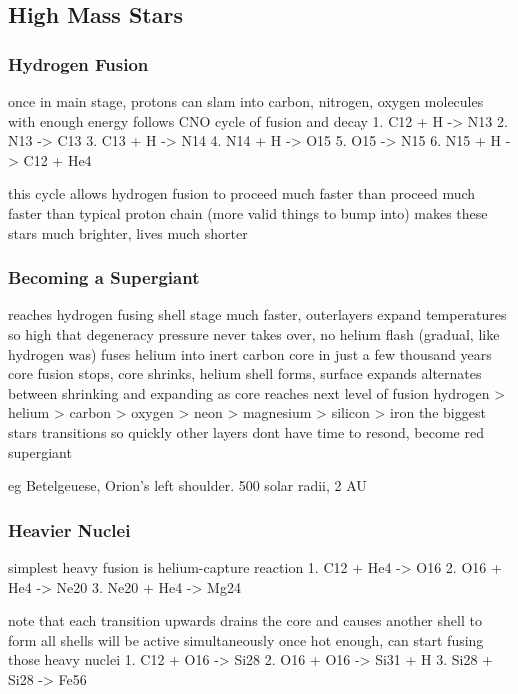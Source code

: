 \subsection{High Mass Stars}
    \subsubsection{Hydrogen Fusion}
        once in main stage, protons can slam into carbon, nitrogen, oxygen molecules with enough energy
        follows CNO cycle of fusion and decay
            1. C12 + H -> N13
            2. N13 -> C13
            3. C13 + H -> N14
            4. N14 + H -> O15
            5. O15 -> N15
            6. N15 + H -> C12 + He4

        this cycle allows hydrogen fusion to proceed much faster than proceed much faster than typical proton chain (more valid things to bump into)
        makes these stars much brighter, lives much shorter

    \subsubsection{Becoming a Supergiant}
        reaches hydrogen fusing shell stage much faster, outerlayers expand
        temperatures so high that degeneracy pressure never takes over, no helium flash (gradual, like hydrogen was)
        fuses helium into inert carbon core in just a few thousand years
        core fusion stops, core shrinks, helium shell forms, surface expands
        alternates between shrinking and expanding as core reaches next level of fusion
        hydrogen > helium > carbon > oxygen > neon > magnesium > silicon > iron
        the biggest stars transitions so quickly other layers dont have time to resond, become red supergiant

        eg Betelgeuese, Orion's left shoulder. 500 solar radii, 2 AU

    \subsubsection{Heavier Nuclei}
        simplest heavy fusion is helium-capture reaction
            1. C12 + He4 -> O16
            2. O16 + He4 -> Ne20
            3. Ne20 + He4 -> Mg24

        note that each transition upwards drains the core and causes another shell to form
        all shells will be active simultaneously
        once hot enough, can start fusing those heavy nuclei
            1. C12 + O16 -> Si28
            2. O16 + O16 -> Si31 + H
            3. Si28 + Si28 -> Fe56

